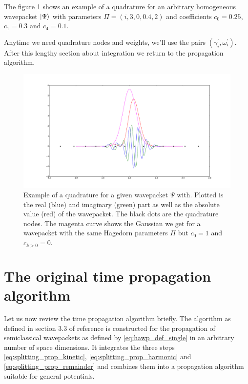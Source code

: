 The figure \ref{fig:quadrature_nodes_single} shows an example of a quadrature for
an arbitrary homogeneous wavepacket $\Ket{\Psi}$ with parameters $\Pi = \left(i,3,0,0.4,2\right)$
and coefficients $c_0 = 0.25$, $c_1 = 0.3$ and $c_4 = 0.1$.

Anytime we need quadrature nodes and weights,
we'll use the pairs $\left(\gamma_i^\prime, \omega_i^\prime\right)$. After this
lengthy section about integration we return to the propagation algorithm.

\begin{figure}
  \centering
  \includegraphics[width=\linewidth]{./figures/quadrature_nodes_single.pdf}
  \caption{Example of a quadrature for a given wavepacket $\Psi$ with. Plotted is
  the real (blue) and imaginary (green) part as well as the absolute value (red) of
  the wavepacket. The black dots are the quadrature nodes. The magenta curve shows
  the Gaussian we get for a wavepacket with the same Hagedorn parameters $\Pi$ but
  $c_0 = 1$ and $c_{k>0} = 0$.}
  \label{fig:quadrature_nodes_single}
\end{figure}

\section{The original time propagation algorithm}
\label{sec:scalar_time_propagation}

Let us now review the time propagation algorithm briefly. The algorithm as defined
in section 3.3 of reference \cite{FGL_semiclassical_dynamics} is constructed for
the propagation of semiclassical wavepackets as defined by \eqref{eq:hawp_def_single}
in an arbitrary number of space dimensions. It integrates the three steps
\eqref{eq:splitting_prop_kinetic}, \eqref{eq:splitting_prop_harmonic} and \eqref{eq:splitting_prop_remainder}
and combines them into a propagation algorithm suitable for general potentials.

